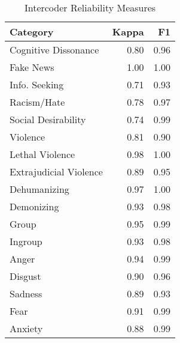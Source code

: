 \begin{table}[ht]
\centering
\caption{Intercoder Reliability Measures} 
\begin{tabular}{lrr}
  \hline
Category & Kappa & F1 \\ 
  \hline
Cognitive Dissonance & 0.80 & 0.96 \\ 
  Fake News & 1.00 & 1.00 \\ 
  Info. Seeking & 0.71 & 0.93 \\ 
  Racism/Hate & 0.78 & 0.97 \\ 
  Social Desirability & 0.74 & 0.99 \\ 
  Violence & 0.81 & 0.90 \\ 
  Lethal Violence & 0.98 & 1.00 \\ 
  Extrajudicial Violence & 0.89 & 0.95 \\ 
  Dehumanizing & 0.97 & 1.00 \\ 
  Demonizing & 0.93 & 0.98 \\ 
  Group & 0.95 & 0.99 \\ 
  Ingroup & 0.93 & 0.98 \\ 
  Anger & 0.94 & 0.99 \\ 
  Disgust & 0.90 & 0.96 \\ 
  Sadness & 0.89 & 0.93 \\ 
  Fear & 0.91 & 0.99 \\ 
  Anxiety & 0.88 & 0.99 \\ 
   \hline
\end{tabular}
\end{table}
